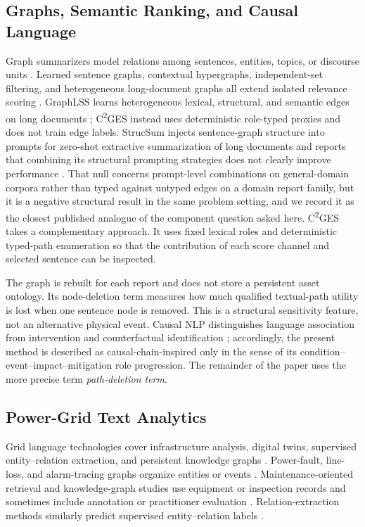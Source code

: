 \documentclass[information,article,submit,moreauthors]{Definitions/mdpi}
\newcommand{\cges}{C\textsuperscript{2}GES}
\begin{document}
\subsection{Graphs, Semantic Ranking, and Causal Language}

Graph summarizers model relations among sentences, entities, topics, or discourse units \cite{wang2020heterogeneous,cui2020enhancing,jing2021multiplex}. Learned sentence graphs, contextual hypergraphs, independent-set filtering, and heterogeneous long-document graphs all extend isolated relevance scoring \cite{siragusa2022sentencegraph,onan2024mches,hark2025mis,bugueno2025graphlss}. GraphLSS learns heterogeneous lexical, structural, and semantic edges on long documents \cite{bugueno2025graphlss}; \cges{} instead uses deterministic role-typed proxies and does not train edge labels. StrucSum injects sentence-graph structure into prompts for zero-shot extractive summarization of long documents and reports that combining its structural prompting strategies does not clearly improve performance \cite{yuan2026strucsum}. That null concerns prompt-level combinations on general-domain corpora rather than typed against untyped edges on a domain report family, but it is a negative structural result in the same problem setting, and we record it as the closest published analogue of the component question asked here. \cges{} takes a complementary approach. It uses fixed lexical roles and deterministic typed-path enumeration so that the contribution of each score channel and selected sentence can be inspected.

The graph is rebuilt for each report and does not store a persistent asset ontology. Its node-deletion term measures how much qualified textual-path utility is lost when one sentence node is removed. This is a structural sensitivity feature, not an alternative physical event. Causal NLP distinguishes language association from intervention and counterfactual identification \cite{feder2022causal,du2022ecare}; accordingly, the present method is described as causal-chain-inspired only in the sense of its condition--event--impact--mitigation role progression. The remainder of the paper uses the more precise term \emph{path-deletion term}.

\subsection{Power-Grid Text Analytics}

Grid language technologies cover infrastructure analysis, digital twins, supervised entity--relation extraction, and persistent knowledge graphs \cite{xie2022massively,hamann2024foundation,madabhushi2023survey,srinivasan2023artificial,ranawaka2024leveraging,meng2023gridfield}. Power-fault, line-loss, and alarm-tracing graphs organize entities or events \cite{liu2022powerfault,li2024lineloss,ma2025alarm}. Maintenance-oriented retrieval and knowledge-graph studies use equipment or inspection records and sometimes include annotation or practitioner evaluation \cite{cao2024coalmaintenance,zgg2026bridge,dimaggio2025predictivemaintenance}. Relation-extraction methods similarly predict supervised entity--relation labels \cite{li2025moere,she2025clear}.
\end{document}
